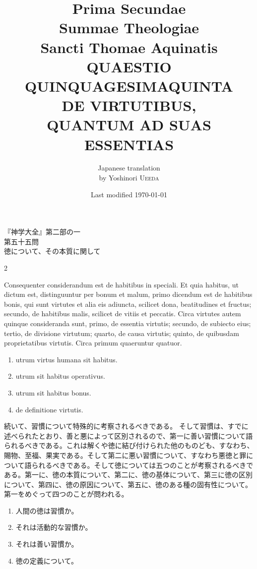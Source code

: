\documentclass[paper=a4paper,fontsize=10pt,jafontsize=9pt,titlepage]{jlreq}
\title{{\bfseries Prima Secundae}\\{\Huge Summae Theologiae}\\Sancti Thomae
Aquinatis\\{\sffamily QUAESTIO QUINQUAGESIMAQUINTA}\\{\bfseries DE VIRTUTIBUS, \\QUANTUM AD SUAS ESSENTIAS}}
\author{Japanese translation\\by Yoshinori {\scshape Ueeda}}
\date{Last modified \today}
\begin{document}
\maketitle
\thispagestyle{empty}
\begin{center}
{\Large 『神学大全』第二部の一\\第五十五問\\徳について、その本質に関して}
\end{center}

\begin{paracol}{2}

Consequenter considerandum est de habitibus in speciali. Et quia
habitus, ut dictum est, distinguuntur per bonum et malum, primo
dicendum est de habitibus bonis, qui sunt virtutes et alia eis
adiuncta, scilicet dona, beatitudines et fructus; secundo, de
habitibus malis, scilicet de vitiis et peccatis. Circa virtutes autem
quinque consideranda sunt, primo, de essentia virtutis; secundo, de
subiecto eius; tertio, de divisione virtutum; quarto, de causa
virtutis; quinto, de quibusdam proprietatibus virtutis. Circa primum
quaeruntur quatuor.

\begin{enumerate}
 \item utrum virtus humana sit habitus.
 \item utrum sit habitus operativus.
 \item utrum sit habitus bonus.
 \item de definitione virtutis.
\end{enumerate}

\switchcolumn

続いて、習慣について特殊的に考察されるべきである。
そして習慣は、すでに述べられたとおり、善と悪によって区別されるので、第一に善い習慣について語られるべきである。これは解くや徳に結び付けられた他のものども、すなわち、賜物、至福、果実である。そして第二に悪い習慣について、すなわち悪徳と罪について語られるべきである。そして徳については五つのことが考察されるべきである。第一に、徳の本質について、第二に、徳の基体について、第三に徳の区別について、第四に、徳の原因について、第五に、徳のある種の固有性について。第一をめぐって四つのことが問われる。

\begin{enumerate}
 \item 人間の徳は習慣か。
 \item それは活動的な習慣か。
 \item それは善い習慣か。
 \item 徳の定義について。
\end{enumerate}

\end{paracol}
\end{document}
